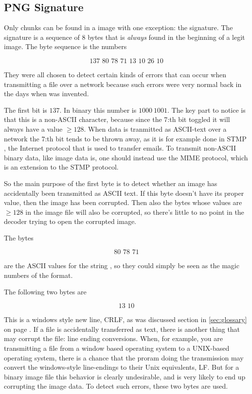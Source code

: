 \subsection{PNG Signature}

Only chunks can be found in a \png image with one exception: the \png
signature. The \png signature is a sequence of 8 bytes that is
\textit{always} found in the beginning of a legit \png image. The byte
sequence is the numbers

\begin{equation*}
  \text{137 80 78 71 13 10 26 10}
\end{equation*}

They were all chosen to detect certain kinds of errors that can occur
when transmitting a \png file over a network because such errors were
very normal back in the days when \png was invented.

The first bit is $137$. In binary this number is $1000\ 1001$. The key
part to notice is that this is a non-ASCII character, because since
the 7:th bit toggled it will always have a value $\ge 128$. When data
is tranmitted as ASCII-text over a network the 7:th bit tends to be
thrown away, as it is for example done in STMP \cite{rfc5321}, the
Internet protocol that is used to transfer emails. To transmit
non-ASCII binary data, like image data is, one should instead use the
MIME protocol, which is an extension to the STMP protocol.

So the main purpose of the first byte is to detect whether an image
has accidentally been transmitted as ASCII text. If this byte doesn't
have its proper value, then the image has been corrupted. Then also
the bytes whose values are $\ge 128$ in the image file will also be
corrupted, so there's little to no point in the decoder trying to open
the corrupted image.

The bytes

\begin{equation*}
  \text{80 78 71}
\end{equation*}

are the ASCII values for the string \png, so they could simply be seen
as the magic numbers of the \png format.

The following two bytes are

\begin{equation*}
  \text{13 10}
\end{equation*}

This is a windows style new line, CRLF, as was discussed section in
\ref{sec:glossary} on page \pageref{sec:glossary}. If a \png file is
accidentally transferred as text, there is another thing that may
corrupt the file: line ending conversions. When, for example, you are
transmitting a file from a window based operating system to a
UNIX-based operating system, there is a chance that the proram doing
the transmission may convert the windows-style line-endings to their
Unix equivalents, LF. But for a binary image file this behavior is
clearly undesirable, and is very likely to end up corrupting the image
data. To detect such errors, these two bytes are used.

